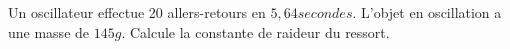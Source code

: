 %
%
    Un oscillateur effectue 20 allers-retours en \(5,64 secondes\). L'objet en oscillation a une masse de \(145g\). Calcule la constante de raideur du ressort.
